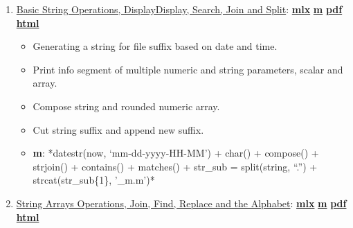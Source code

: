 \documentclass[
]{book}
\providecommand{\tightlist}{%
  \setlength{\itemsep}{0pt}\setlength{\parskip}{0pt}}
\begin{document}
\begin{enumerate}
\def\labelenumi{\arabic{enumi}.}
\tightlist
\item
  \href{https://fanwangecon.github.io/M4Econ/amto/string/htmlpdfm/fs_string.html}{Basic String Operations, DisplayDisplay, Search, Join and Split}: \href{https://github.com/FanWangEcon/M4Econ/blob/master/amto/string/fs_string.mlx}{\textbf{mlx}} \textbar{} \href{https://github.com/FanWangEcon/M4Econ/blob/master/amto/string/htmlpdfm/fs_string.m}{\textbf{m}} \textbar{} \href{https://github.com/FanWangEcon/M4Econ/blob/master/amto/string/htmlpdfm/fs_string.pdf}{\textbf{pdf}} \textbar{} \href{https://fanwangecon.github.io/M4Econ/amto/string/htmlpdfm/fs_string.html}{\textbf{html}}

  \begin{itemize}
  \tightlist
  \item
    Generating a string for file suffix based on date and time.
  \item
    Print info segment of multiple numeric and string parameters, scalar and array.
  \item
    Compose string and rounded numeric array.
  \item
    Cut string suffix and append new suffix.
  \item
    \textbf{m}: *datestr(now, `mm-dd-yyyy-HH-MM') + char() + compose() + strjoin() + contains() + matches() + str\_sub = split(string, ``.'') + strcat(str\_sub\{1\}, '\_m.m')*
  \end{itemize}
\item
  \href{https://fanwangecon.github.io/M4Econ/amto/string/htmlpdfm/fs_string_array.html}{String Arrays Operations, Join, Find, Replace and the Alphabet}: \href{https://github.com/FanWangEcon/M4Econ/blob/master/amto/string/fs_string_array.mlx}{\textbf{mlx}} \textbar{} \href{https://github.com/FanWangEcon/M4Econ/blob/master/amto/string/htmlpdfm/fs_string_array.m}{\textbf{m}} \textbar{} \href{https://github.com/FanWangEcon/M4Econ/blob/master/amto/string/htmlpdfm/fs_string_array.pdf}{\textbf{pdf}} \textbar{} \href{https://fanwangecon.github.io/M4Econ/amto/string/htmlpdfm/fs_string_array.html}{\textbf{html}}


\end{enumerate}
\end{document}
